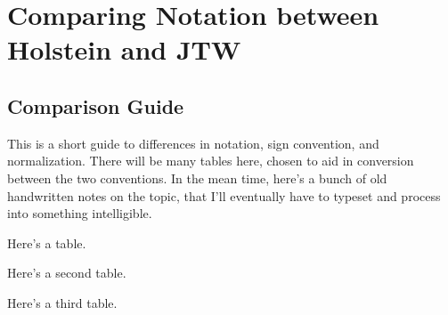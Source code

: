 


\chapter[Notation]{Comparing Notation between Holstein and JTW}
\label{appendix_notation}

\section{Comparison Guide}
	This is a short guide to differences in notation, sign convention, and normalization.  There will be many tables here, chosen to aid in conversion between the two conventions.  In the mean time, here's a bunch of old handwritten notes on the topic, that I'll eventually have to typeset and process into something intelligible.  

Here's a table.


Here's a second table.


Here's a third table.




